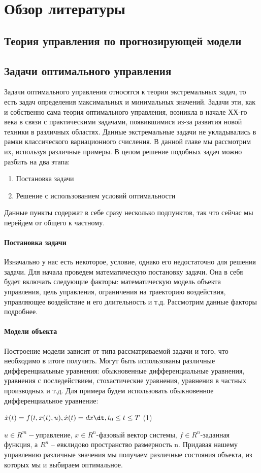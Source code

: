 \documentclass[12pt]{article}
\begin{document}
\section{Обзор литературы}
\subsection{Теория управления по прогнозирующей модели}
\newpage
\subsection{Задачи оптимального управления}
\normalsize{Задачи оптимального управления относятся к теории экстремальных задач, то есть задач определения максимальных и минимальных значений. Задачи эти, как и собственно сама теория оптимального управления, возникла в начале ХХ-го века в связи с практическими задачами, появившимися из-за развития новой техники в различных областях. Данные экстремальные задачи не укладывались в рамки классического вариационного счисления.
	В данной главе мы рассмотрим их, используя различные примеры. В целом решение подобных задач можно разбить на два этапа:
	\begin{enumerate}
		\item Постановка задачи
		\item Решение с использованием условий оптимальности
	\end{enumerate}
Данные пункты содержат в себе сразу несколько подпунктов, так что сейчас мы перейдем от общего к частному.
}
\paragraph{Постановка задачи}
	\hfill \break
\normalsize{Изначально у нас есть некоторое, условие, однако его недостаточно для решения задачи. Для начала проведем математическую постановку задачи. 
	Она в себя будет включать следующие факторы: математическую модель объекта управления, цель управления, ограничения на траекторию воздействия, управляющее воздействие и его длительность и т.д. Рассмотрим данные факторы подробнее.
}\\
\paragraph{Модели объекта}
	\hfill \break
\normalsize{Построение модели зависит от типа рассматриваемой задачи и того, что необходимо в итоге получить. Могут быть использованы различные дифференциальные уравнения: обыкновенные дифференциальные уравнения, уравнения с последействием, стохастические уравнения, уравнения в частных производных и т.д.
	Для примера будем использовать обыкновенное дифференциальное уравнение: }\\
\begin{flushright}
	\normalsize{ $\dot x(t) = f(t,x(t),u),\dot x(t)=dx\dt, t_0 \le t \le T $ \hspace{4cm} (1)}
\end{flushright}
\normalsize{$u \in R^m-$управление, $x \in R^n$-фазовый вектор системы, $f \in R^n$-заданная функция, а $R^n$ – евклидово пространство размерность n. Придавая нашему управлению различные значения мы получаем различные состояния объекта, из которых мы и выбираем оптимальное. }
\end{document}
